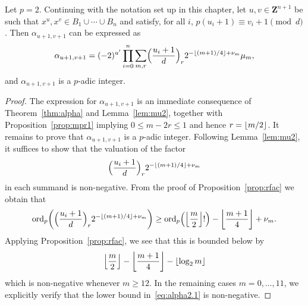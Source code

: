 \begin{thm} \label{thm:alpha2}
Let $p = 2$. 
Continuing with the notation set up in this chapter, let 
$u, v \in \mathbf{Z}^{n+1}$ be such that 
$x^u, x^v \in B_1 \cup \dotsb \cup B_n$ and satisfy, 
for all $i$, $p (u_i + 1) \equiv v_i + 1 \pmod{d}$. 
Then $\alpha_{u+1,v+1}$ can be expressed as 
\begin{equation} \label{eq:alpha2.0}
\alpha_{u+1,v+1} = (-2)^{u'} \prod_{i=0}^n \sum_{m,r} 
    \Bigl(\frac{u_i+1}{d}\Bigr)_r 2^{-\left\lfloor(m+1)/4\right\rfloor+\nu_m} \mu_m, 
\end{equation}
and $\alpha_{u+1,v+1}$ is a $p$-adic integer.
\end{thm}

\begin{proof}
The expression for $\alpha_{u+1,v+1}$ is an immediate consequence 
of Theorem~\ref{thm:alpha} and Lemma~\ref{lem:mu2}, together with 
Proposition~\ref{prop:mpr1} implying $0 \leq m - 2r \leq 1$ and 
hence $r = \left\lfloor m/2\right\rfloor$.  It remains to prove that 
$\alpha_{u+1,v+1}$ is a $p$-adic integer.  Following Lemma~\ref{lem:mu2}, 
it suffices to show that the valuation of the factor 
\begin{equation*}
\Bigl(\frac{u_i+1}{d}\Bigr)_r 2^{- \left\lfloor(m+1)/4\right\rfloor + \nu_m}
\end{equation*}
in each summand is non-negative.  From the proof of 
Proposition~\ref{prop:rfac} we obtain that 
\begin{equation} \label{eq:alpha2.1}
\operatorname{ord}_p \biggl( \Bigl(\frac{u_i+1}{d}\Bigr)_r 2^{- \left\lfloor(m+1)/4\right\rfloor + \nu_m} \biggr)
\geq \operatorname{ord}_p\Bigl(\left\lfloor\frac{m}{2}\right\rfloor!\Bigr) - \left\lfloor\frac{m+1}{4}\right\rfloor + \nu_m.
\end{equation}
Applying Proposition~\ref{prop:rfac}, we see that this is bounded 
below by 
\begin{equation*}
\left\lfloor\frac{m}{2}\right\rfloor - \left\lfloor\frac{m+1}{4}\right\rfloor - \left\lfloor\log_2 m\right\rfloor
\end{equation*}
which is non-negative whenever $m \geq 12$.  In the remaining 
cases $m = 0, \dotsc, 11$, we explicitly verify that the 
lower bound in~\eqref{eq:alpha2.1} is non-negative.
\end{proof}

